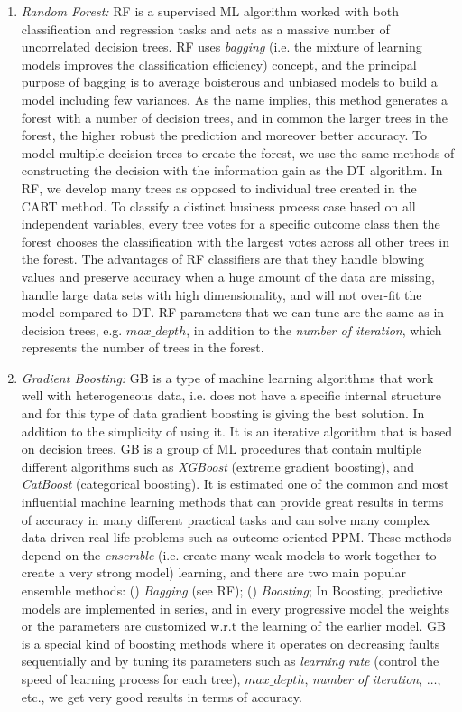 \begin{enumerate}
	\item \textit{Random Forest:} RF is a supervised ML algorithm worked with both classification and regression tasks and acts as a massive number of uncorrelated decision trees. RF uses \textit{bagging} (i.e. the mixture of learning models improves the classification efficiency) concept, and the principal purpose of bagging is to average boisterous and unbiased models to build a model including few variances. As the name implies, this method generates a forest with a number of decision trees, and in common the larger trees in the forest, the higher robust the prediction and moreover better accuracy. To model multiple decision trees to create the forest, we use the same methods of constructing the decision with the information gain as the DT algorithm.  In RF, we develop many trees as opposed to individual tree created in the CART method. To classify a distinct business process case based on all independent variables, every tree votes for a specific outcome class then the forest chooses the classification with the largest votes across all other trees in the forest. The advantages of RF classifiers are that they handle blowing values and preserve accuracy when a huge amount of the data are missing, handle large data sets with high dimensionality, and will not over-fit the model compared to DT. RF parameters that we can tune are the same as in decision trees, e.g. $max\_depth$, in addition to the \textit{number of iteration}, which represents the number of trees in the forest.
	
	
	
	
	\item \textit{Gradient Boosting:} GB is a type of machine learning algorithms that work well with heterogeneous data, i.e. does not have a specific internal structure and for this type of data gradient boosting is giving the best solution. In addition to the simplicity of using it. It is an iterative algorithm that is based on decision trees. GB is a group of ML procedures that contain multiple different algorithms such as \textit{XGBoost} (extreme gradient boosting), and \textit{CatBoost} (categorical boosting). It is estimated one of the common and most influential machine learning methods that can provide great results in terms of accuracy in many different practical tasks and can solve many complex data-driven real-life problems such as outcome-oriented PPM. These methods depend on the \textit{ensemble} (i.e. create many weak models to work together to create a very strong model) learning, and there are two main popular ensemble methods: () \textit{Bagging} (see RF); () \textit{Boosting}; In Boosting, predictive models are implemented in series, and in every progressive model the weights or the parameters are customized w.r.t the learning of the earlier model. GB is a special kind of boosting methods where it operates on decreasing faults sequentially and by tuning its parameters such as \textit{learning rate} (control the speed of learning process for each tree), $max\_depth$, \textit{number of iteration}, $\dots$, etc., we get very good results in terms of accuracy.  
	

\end{enumerate}
